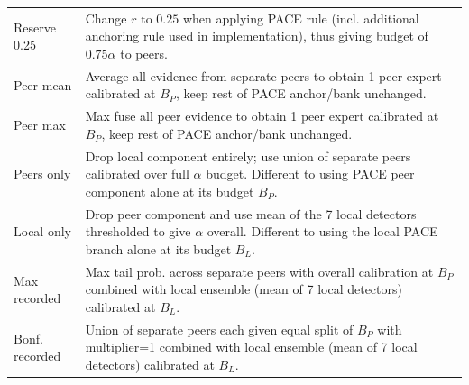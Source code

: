 {\begin{longtable}{p{}p{}}
Reserve 0.25 & Change $r$ to $0.25$ when applying PACE rule (incl. additional anchoring rule used in implementation), thus giving budget of $0.75\alpha$ to peers.\\
Peer mean & Average all evidence from separate peers to obtain 1 peer expert calibrated at $B_P$, keep rest of PACE anchor/bank unchanged.\\
Peer max & Max fuse all peer evidence to obtain 1 peer expert calibrated at $B_P$, keep rest of PACE anchor/bank unchanged.\\
Peers only & Drop local component entirely; use union of separate peers calibrated over full $\alpha$ budget. Different to using PACE peer component alone at its budget $B_P$.\\
Local only & Drop peer component and use mean of the 7 local detectors thresholded to give $\alpha$ overall. Different to using the local PACE branch alone at its budget $B_L$.\\
Max recorded & Max tail prob. across separate peers with overall calibration at $B_P$ combined with local ensemble (mean of 7 local detectors) calibrated at $B_L$.\\
Bonf. recorded & Union of separate peers each given equal split of $B_P$ with multiplier=1 combined with local ensemble (mean of 7 local detectors) calibrated at $B_L$.\\
\end{longtable}} 
